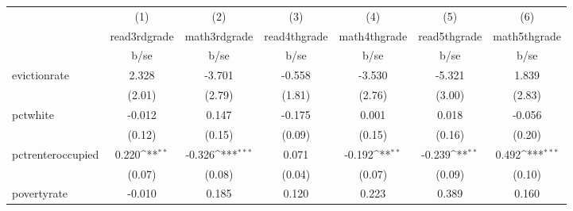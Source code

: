 {
\def\sym#1{\ifmmode^{#1}\else\(^{#1}\)\fi}
\begin{tabular}{l*{6}{c}}
\hline\hline
            &\multicolumn{1}{c}{(1)}           &\multicolumn{1}{c}{(2)}           &\multicolumn{1}{c}{(3)}           &\multicolumn{1}{c}{(4)}           &\multicolumn{1}{c}{(5)}           &\multicolumn{1}{c}{(6)}           \\
            &\multicolumn{1}{c}{read3rdgrade}  &\multicolumn{1}{c}{math3rdgrade}  &\multicolumn{1}{c}{read4thgrade}  &\multicolumn{1}{c}{math4thgrade}  &\multicolumn{1}{c}{read5thgrade}  &\multicolumn{1}{c}{math5thgrade}  \\
            &                     b/se         &                     b/se         &                     b/se         &                     b/se         &                     b/se         &                     b/se         \\
\hline
evictionrate&                    2.328         &                   -3.701         &                   -0.558         &                   -3.530         &                   -5.321         &                    1.839         \\
            &                   (2.01)         &                   (2.79)         &                   (1.81)         &                   (2.76)         &                   (3.00)         &                   (2.83)         \\
pctwhite    &                   -0.012         &                    0.147         &                   -0.175         &                    0.001         &                    0.018         &                   -0.056         \\
            &                   (0.12)         &                   (0.15)         &                   (0.09)         &                   (0.15)         &                   (0.16)         &                   (0.20)         \\
pctrenteroccupied&                    0.220\sym{**} &                   -0.326\sym{***}&                    0.071         &                   -0.192\sym{**} &                   -0.239\sym{**} &                    0.492\sym{***}\\
            &                   (0.07)         &                   (0.08)         &                   (0.04)         &                   (0.07)         &                   (0.09)         &                   (0.10)         \\
povertyrate &                   -0.010         &                    0.185         &                    0.120         &                    0.223         &                    0.389         &                    0.160         \\

\end{tabular}}
